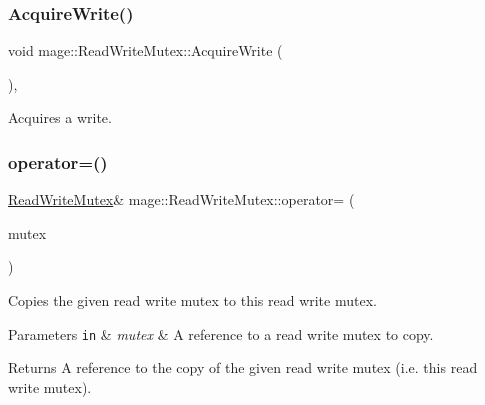 \subsubsection{\texorpdfstring{Acquire\+Write()}{AcquireWrite()}}
{\footnotesize\ttfamily void mage\+::\+Read\+Write\+Mutex\+::\+Acquire\+Write (\begin{DoxyParamCaption}{ }\end{DoxyParamCaption})\hspace{0.3cm}{\ttfamily [private]}, {\ttfamily [noexcept]}}

Acquires a write. \hypertarget{classmage_1_1_read_write_mutex_a408e06f3c8bcc644e43afbf7e9ac772f}{}\label{classmage_1_1_read_write_mutex_a408e06f3c8bcc644e43afbf7e9ac772f} 
\subsubsection{\texorpdfstring{operator=()}{operator=()}\hspace{0.1cm}{\footnotesize\ttfamily [1/2]}}
{\footnotesize\ttfamily \hyperlink{classmage_1_1_read_write_mutex}{Read\+Write\+Mutex}\& mage\+::\+Read\+Write\+Mutex\+::operator= (\begin{DoxyParamCaption}\item[{const \hyperlink{classmage_1_1_read_write_mutex}{Read\+Write\+Mutex} \&}]{mutex }\end{DoxyParamCaption})\hspace{0.3cm}{\ttfamily [delete]}}

Copies the given read write mutex to this read write mutex.


\begin{DoxyParams}[1]{Parameters}
\mbox{\tt in}  & {\em mutex} & A reference to a read write mutex to copy. \\
\hline
\end{DoxyParams}
\begin{DoxyReturn}{Returns}
A reference to the copy of the given read write mutex (i.\+e. this read write mutex). 
\end{DoxyReturn}
\hypertarget{classmage_1_1_read_write_mutex_a8fe8592d73b6705a0bf8470102c5d550}{}\label{classmage_1_1_read_write_mutex_a8fe8592d73b6705a0bf8470102c5d550} 
